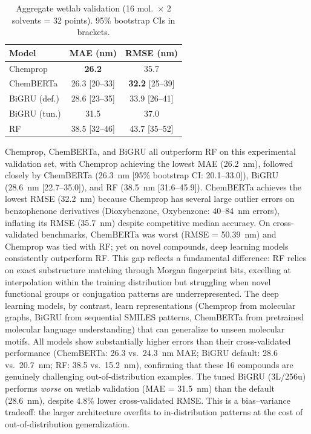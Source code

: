 \begin{table}[htbp]
\centering
\caption{Aggregate wetlab validation (16 mol.\ $\times$ 2 solvents = 32 points). 95\% bootstrap CIs in brackets.}
\label{tab:wetlab_summary}
\footnotesize
\setlength{\tabcolsep}{3pt}
\begin{tabular}{@{}lcc@{}}
\toprule
\textbf{Model} & \textbf{MAE (nm)} & \textbf{RMSE (nm)} \\
\midrule
Chemprop    & \textbf{26.2}         & 35.7 \\
ChemBERTa   & 26.3 {\scriptsize[20--33]}  & \textbf{32.2} {\scriptsize[25--39]} \\
BiGRU (def.)& 28.6 {\scriptsize[23--35]}  & 33.9 {\scriptsize[26--41]} \\
BiGRU (tun.)& 31.5                  & 37.0 \\
RF          & 38.5 {\scriptsize[32--46]}  & 43.7 {\scriptsize[35--52]} \\
\bottomrule
\end{tabular}
\end{table}

Chemprop, ChemBERTa, and BiGRU all outperform RF on this experimental validation set, with Chemprop achieving the lowest MAE (26.2~nm), followed closely by ChemBERTa (26.3~nm [95\% bootstrap CI: 20.1--33.0]), BiGRU (28.6~nm [22.7--35.0]), and RF (38.5~nm [31.6--45.9]).
ChemBERTa achieves the lowest RMSE (32.2~nm) because Chemprop has several large outlier errors on benzophenone derivatives (Dioxybenzone, Oxybenzone: 40--84~nm errors), inflating its RMSE (35.7~nm) despite competitive median accuracy.
On cross-validated benchmarks, ChemBERTa was worst (RMSE = 50.39~nm) and Chemprop was tied with RF; yet on novel compounds, deep learning models consistently outperform RF.
This gap reflects a fundamental difference: RF relies on exact substructure matching through Morgan fingerprint bits, excelling at interpolation within the training distribution but struggling when novel functional groups or conjugation patterns are underrepresented.
The deep learning models, by contrast, learn representations (Chemprop from molecular graphs, BiGRU from sequential SMILES patterns, ChemBERTa from pretrained molecular language understanding) that can generalize to unseen molecular motifs.
All models show substantially higher errors than their cross-validated performance (ChemBERTa: 26.3 vs.\ 24.3~nm MAE; BiGRU default: 28.6 vs.\ 20.7~nm; RF: 38.5 vs.\ 15.2~nm), confirming that these 16 compounds are genuinely challenging out-of-distribution examples.
The tuned BiGRU (3L/256u) performs \textit{worse} on wetlab validation (MAE = 31.5~nm) than the default (28.6~nm), despite 4.8\% lower cross-validated RMSE. This is a bias--variance tradeoff: the larger architecture overfits to in-distribution patterns at the cost of out-of-distribution generalization.

